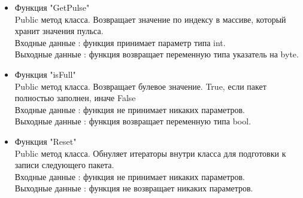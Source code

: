 \documentclass[a4document]{article}
\begin{document}
{\begin{itemize}
\begin{itemize}
                \item Функция "GetPulse" \\
                    Public метод класса. Возвращает значение по индексу в массиве, который хранит значения пульса. \\ 
                    Входные данные : функция принимает параметр типа int. \\
                    Выходные данные : функция возвращает переменную типа указатель на byte.
                
                \item Функция "isFull" \\
                    Public метод класса. Возвращает булевое значение. True, если пакет полностью заполнен, иначе False \\ 
                    Входные данные : функция не принимает никаких параметров. \\
                    Выходные данные : функция возвращает переменную типа bool.
                \item Функция "Reset" \\
                    Public метод класса. Обнуляет итераторы внутри класса для подготовки к записи следующего пакета.\\
                    Входные данные : функция не принимает никаких параметров. \\
                    Выходные данные : функция не возвращает никаких параметров.
                    

\end{itemize}
\end{itemize}}
\end{document}
